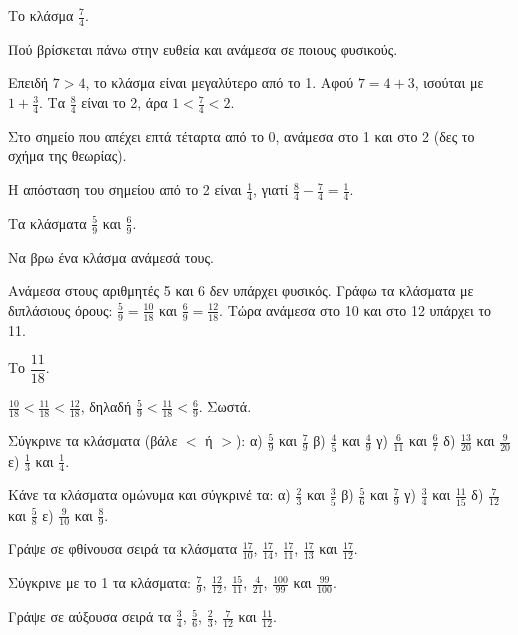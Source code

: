 \tixero Το κλάσμα $\frac{7}{4}$.\par
\tithelo Πού βρίσκεται πάνω στην ευθεία και ανάμεσα σε ποιους φυσικούς.\par
\possindeo Επειδή $7>4$, το κλάσμα είναι μεγαλύτερο από το 1. Αφού $7=4+3$, ισούται με $1+\frac{3}{4}$. Τα $\frac{8}{4}$ είναι το 2, άρα $1<\frac{7}{4}<2$.\par
\apantisi Στο σημείο που απέχει επτά τέταρτα από το 0, ανάμεσα στο 1 και στο 2 (δες το σχήμα της θεωρίας).\par
\elegxos Η απόσταση του σημείου από το 2 είναι $\frac{1}{4}$, γιατί $\frac{8}{4}-\frac{7}{4}=\frac{1}{4}$.

\tixero Τα κλάσματα $\frac{5}{9}$ και $\frac{6}{9}$.\par
\tithelo Να βρω ένα κλάσμα ανάμεσά τους.\par
\possindeo Ανάμεσα στους αριθμητές 5 και 6 δεν υπάρχει φυσικός. Γράφω τα κλάσματα με διπλάσιους όρους: $\frac{5}{9}=\frac{10}{18}$ και $\frac{6}{9}=\frac{12}{18}$. Τώρα ανάμεσα στο 10 και στο 12 υπάρχει το 11.\par
\apantisi Το $\dfrac{11}{18}$.\par
\elegxos $\frac{10}{18}<\frac{11}{18}<\frac{12}{18}$, δηλαδή $\frac{5}{9}<\frac{11}{18}<\frac{6}{9}$. Σωστά.



\ex Σύγκρινε τα κλάσματα (βάλε $<$ ή $>$): α) $\frac{5}{9}$ και $\frac{7}{9}$ \quad β) $\frac{4}{5}$ και $\frac{4}{9}$ \quad γ) $\frac{6}{11}$ και $\frac{6}{7}$ \quad δ) $\frac{13}{20}$ και $\frac{9}{20}$ \quad ε) $\frac{1}{3}$ και $\frac{1}{4}$.

\ex Κάνε τα κλάσματα ομώνυμα και σύγκρινέ τα: α) $\frac{2}{3}$ και $\frac{3}{5}$ \quad β) $\frac{5}{6}$ και $\frac{7}{9}$ \quad γ) $\frac{3}{4}$ και $\frac{11}{15}$ \quad δ) $\frac{7}{12}$ και $\frac{5}{8}$ \quad ε) $\frac{9}{10}$ και $\frac{8}{9}$.

\ex Γράψε σε φθίνουσα σειρά τα κλάσματα $\frac{17}{10}$, $\frac{17}{14}$, $\frac{17}{11}$, $\frac{17}{13}$ και $\frac{17}{12}$.

\ex Σύγκρινε με το 1 τα κλάσματα: $\frac{7}{9}$, $\frac{12}{12}$, $\frac{15}{11}$, $\frac{4}{21}$, $\frac{100}{99}$ και $\frac{99}{100}$.

\ex Γράψε σε αύξουσα σειρά τα $\frac{3}{4}$, $\frac{5}{6}$, $\frac{2}{3}$, $\frac{7}{12}$ και $\frac{11}{12}$.

